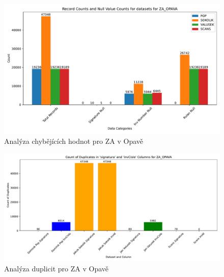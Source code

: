\begin{figure}[htbp]
\centering
    \includegraphics[scale=.5]{obrazky-figures/dataAnalysis/zaOpava/missingValues.pdf}
    \caption{Analýza chybějících hodnot pro ZA v Opavě}
\end{figure}

\begin{figure}[htbp]
\centering
    \includegraphics[scale=.5]{obrazky-figures/dataAnalysis/zaOpava/duplicities.pdf}
    \caption{Analýza duplicit pro ZA v Opavě}
\end{figure}

